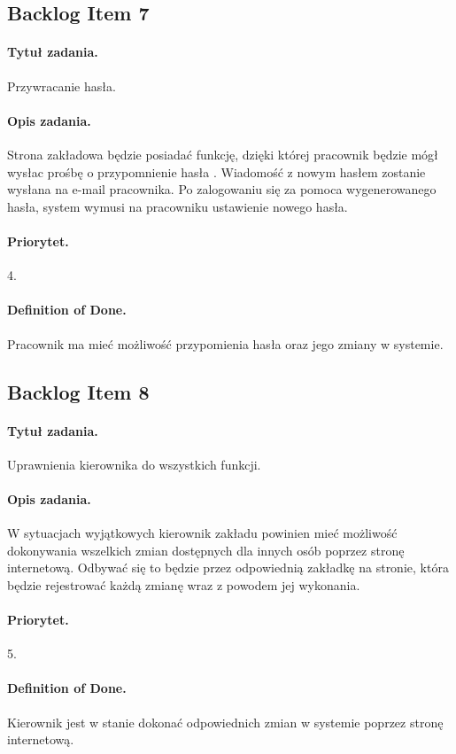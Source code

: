 \documentclass[a4paper]{article}
\begin{document}
\subsection{Backlog Item 7}
\paragraph{Tytuł zadania.} Przywracanie hasła.
\paragraph{Opis zadania.} Strona zakładowa będzie posiadać funkcję, dzięki której pracownik będzie mógł wysłac prośbę o przypomnienie hasła . Wiadomość z nowym hasłem zostanie wysłana na e-mail pracownika. Po zalogowaniu się za pomoca wygenerowanego hasła, system wymusi na pracowniku ustawienie nowego hasła.
\paragraph{Priorytet.} 4.
\paragraph{Definition of Done.} Pracownik ma mieć możliwość przypomienia hasła oraz jego zmiany w systemie.

\subsection{Backlog Item 8}
\paragraph{Tytuł zadania.} Uprawnienia kierownika do wszystkich funkcji.
\paragraph{Opis zadania.} W sytuacjach wyjątkowych kierownik zakładu powinien mieć możliwość dokonywania wszelkich zmian dostępnych dla innych osób poprzez stronę internetową. Odbywać się to będzie przez odpowiednią zakładkę na stronie, która będzie rejestrować każdą zmianę wraz z powodem jej wykonania.
\paragraph{Priorytet.} 5.
\paragraph{Definition of Done.} Kierownik jest w stanie dokonać odpowiednich zmian w systemie poprzez stronę internetową.
\end{document}
